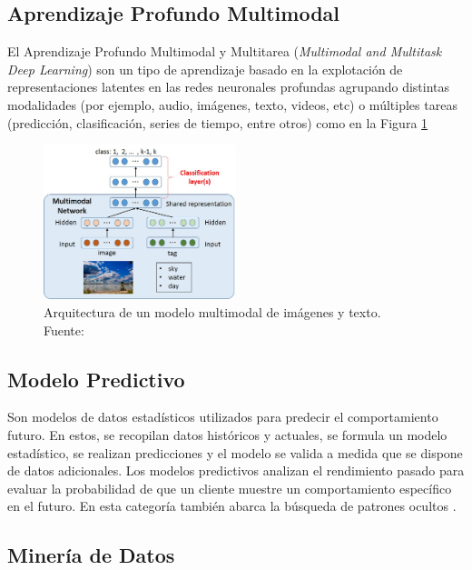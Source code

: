 \subsection{Aprendizaje Profundo Multimodal}
El Aprendizaje Profundo Multimodal y Multitarea (\textit{Multimodal and Multitask Deep Learning}) son un tipo de aprendizaje basado en la explotación de representaciones latentes en las redes neuronales profundas agrupando distintas modalidades (por ejemplo, audio, imágenes, texto, videos, etc) o múltiples tareas (predicción, clasificación, series de tiempo, entre otros) como en la Figura \ref{2:fig46} \parencite{bk_deng2018deeplearningnlp}

\begin{figure}[!ht]
	\begin{center}
		\includegraphics[width=0.50\textwidth]{2/figures/multimodal_network.jpg}
		\caption[Arquitectura de un modelo multimodal de imágenes y texto]{Arquitectura de un modelo multimodal de imágenes y texto.\\
			Fuente: \cite{tec_nishida2015multimodal}}
		\label{2:fig46}
	\end{center}
\end{figure}

\subsection{Modelo Predictivo}

Son modelos de datos estadísticos utilizados para predecir el comportamiento futuro. En estos, se recopilan datos históricos y actuales, se formula un modelo estadístico, se realizan predicciones y el modelo se valida a medida que se dispone de datos adicionales. Los modelos predictivos analizan el rendimiento pasado para evaluar la probabilidad de que un cliente muestre un comportamiento específico en el futuro. En esta categoría también abarca la búsqueda de patrones ocultos \parencite{gl_gartner2019pm}.

\subsection{Minería de Datos}


